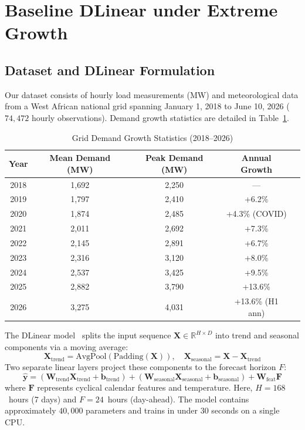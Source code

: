 \documentclass[11pt,letterpaper]{article}
\begin{document}
\section{Baseline DLinear under Extreme Growth}
\label{sec:baseline}

\subsection{Dataset and DLinear Formulation}
Our dataset consists of hourly load measurements (MW) and meteorological data from a West African national grid spanning January 1, 2018 to June 10, 2026 ($74,472$ hourly observations). Demand growth statistics are detailed in Table~\ref{tab:growth_stats}.

\begin{table}[h]
\centering
\small
\setlength{\tabcolsep}{3pt}
\caption{Grid Demand Growth Statistics (2018--2026)}
\label{tab:growth_stats}
\begin{tabular}{@{}ccccc@{}}
\toprule
\textbf{Year} & \textbf{Mean Demand (MW)} & \textbf{Peak Demand (MW)} & \textbf{Annual Growth} \\ \midrule
2018 & 1,692 & 2,250 & --- \\
2019 & 1,797 & 2,410 & +6.2\% \\
2020 & 1,874 & 2,485 & +4.3\% (COVID) \\
2021 & 2,011 & 2,692 & +7.3\% \\
2022 & 2,145 & 2,891 & +6.7\% \\
2023 & 2,316 & 3,120 & +8.0\% \\
2024 & 2,537 & 3,425 & +9.5\% \\
2025 & 2,882 & 3,790 & +13.6\% \\
2026 & 3,275 & 4,031 & +13.6\% (H1 ann) \\ \bottomrule
\end{tabular}
\end{table}

The DLinear model~\cite{zeng2023transformers} splits the input sequence $\mathbf{X} \in \mathbb{R}^{H \times D}$ into trend and seasonal components via a moving average:
\begin{equation}
\mathbf{X}_{\text{trend}} = \text{AvgPool}(\text{Padding}(\mathbf{X})), \quad \mathbf{X}_{\text{seasonal}} = \mathbf{X} - \mathbf{X}_{\text{trend}}
\end{equation}
Two separate linear layers project these components to the forecast horizon $F$:
\begin{equation}
\hat{\mathbf{y}} = (\mathbf{W}_{\text{trend}} \mathbf{X}_{\text{trend}} + \mathbf{b}_{\text{trend}}) + (\mathbf{W}_{\text{seasonal}} \mathbf{X}_{\text{seasonal}} + \mathbf{b}_{\text{seasonal}}) + \mathbf{W}_{\text{feat}} \mathbf{F}
\end{equation}
where $\mathbf{F}$ represents cyclical calendar features and temperature. Here, $H = 168$~hours (7 days) and $F = 24$~hours (day-ahead). The model contains approximately $40,000$ parameters and trains in under 30 seconds on a single CPU.
\end{document}
